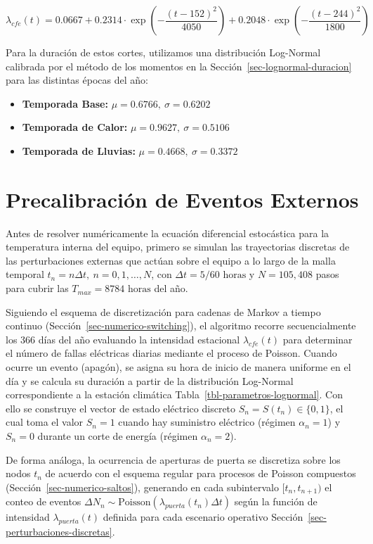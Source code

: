 \documentclass[
  spanish,
  us-letterpaper,
]{scrreprt}
\providecommand{\tightlist}{%
  \setlength{\itemsep}{0pt}\setlength{\parskip}{0pt}}
\numberwithin{equation}{section}
\theoremstyle{plain}
\theoremstyle{plain}
\theoremstyle{plain}
\theoremstyle{definition}
\theoremstyle{remark}
\begin{document}
\[
\lambda_{cfe}(t) = 0.0667 + 0.2314 \cdot \exp\left(-\frac{(t - 152)^2}{4050}\right) + 0.2048 \cdot \exp\left(-\frac{(t - 244)^2}{1800}\right)
\]

Para la duración de estos cortes, utilizamos una distribución Log-Normal
calibrada por el método de los momentos en la
Sección~\ref{sec-lognormal-duracion} para las distintas épocas del año:

\begin{itemize}
\tightlist
\item
  \textbf{Temporada Base:} \(\mu = 0.6766, \ \sigma = 0.6202\)
\item
  \textbf{Temporada de Calor:} \(\mu = 0.9627, \ \sigma = 0.5106\)
\item
  \textbf{Temporada de Lluvias:} \(\mu = 0.4668, \ \sigma = 0.3372\)
\end{itemize}

\section{Precalibración de Eventos
Externos}\label{precalibraciuxf3n-de-eventos-externos}

Antes de resolver numéricamente la ecuación diferencial estocástica para
la temperatura interna del equipo, primero se simulan las trayectorias
discretas de las perturbaciones externas que actúan sobre el equipo a lo
largo de la malla temporal \(t_n = n\Delta t, \ n = 0, 1, \dots, N\),
con \(\Delta t = 5/60\text{ horas}\) y \(N = 105,408\) pasos para cubrir
las \(T_{max} = 8784\text{ horas}\) del año.

Siguiendo el esquema de discretización para cadenas de Markov a tiempo
continuo (Sección~\ref{sec-numerico-switching}), el algoritmo recorre
secuencialmente los 366 días del año evaluando la intensidad estacional
\(\lambda_{cfe}(t)\) para determinar el número de fallas eléctricas
diarias mediante el proceso de Poisson. Cuando ocurre un evento
(apagón), se asigna su hora de inicio de manera uniforme en el día y se
calcula su duración a partir de la distribución Log-Normal
correspondiente a la estación climática
Tabla~\ref{tbl-parametros-lognormal}. Con ello se construye el vector de
estado eléctrico discreto \(S_n = S(t_n) \in \{0, 1\}\), el cual toma el
valor \(S_n = 1\) cuando hay suministro eléctrico (régimen
\(\alpha_n = 1\)) y \(S_n = 0\) durante un corte de energía (régimen
\(\alpha_n = 2\)).

De forma análoga, la ocurrencia de aperturas de puerta se discretiza
sobre los nodos \(t_n\) de acuerdo con el esquema regular para procesos
de Poisson compuestos (Sección~\ref{sec-numerico-saltos}), generando en
cada subintervalo \([t_n, t_{n+1})\) el conteo de eventos
\(\Delta N_n \sim \text{Poisson}(\lambda_{puerta}(t_n)\Delta t)\) según
la función de intensidad \(\lambda_{puerta}(t)\) definida para cada
escenario operativo Sección~\ref{sec-perturbaciones-discretas}.
\end{document}
